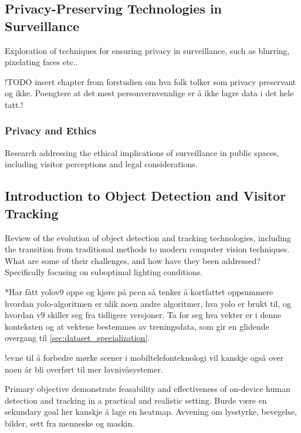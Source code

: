 \subsection{Privacy-Preserving Technologies in Surveillance}
Exploration of techniques for ensuring privacy in surveillance, such as blurring, pixelating faces etc.. 

!TODO insert chapter from forstudien om hva folk tolker som privacy preservant og ikke. Poengtere at det mest personvernvennlige er å ikke lagre data i det hele tatt.!

\subsubsection{Privacy and Ethics}
Research addressing the ethical implications of surveillance in public spaces, including visitor perceptions and legal considerations.



\subsection{Introduction to Object Detection and Visitor Tracking}
Review of the evolution of object detection and tracking technologies, including the transition from traditional methods to modern computer vision techniques. What are some of their challenges, and how have they been addressed? Specifically focusing on suboptimal lighting conditions.

*Har fått yolov9 oppe og kjøre på pcen så tenker å kortfattet oppsummere hvordan yolo-algoritmen er ulik noen andre algoritmer, hva yolo er brukt til, og hvordan v9 skiller seg fra tidligere versjoner. Ta for seg hva vekter er i denne konteksten og at vektene bestemmes av treningsdata, som gir en glidende overgang til \ref{sec:dataset_specialization}.

!evne til å forbedre mørke scener i mobiltelefonteknologi vil kanskje også over noen år bli overført til mer lavnivåsystemer.

Primary objective demonstrate feasability and effectiveness of on-device human detection and tracking in a practical and realistic setting.
Burde være en sekundary goal her kanskje å lage en heatmap.
Avvening om lysstyrke, bevegelse, bilder, sett fra menneske og maskin.


